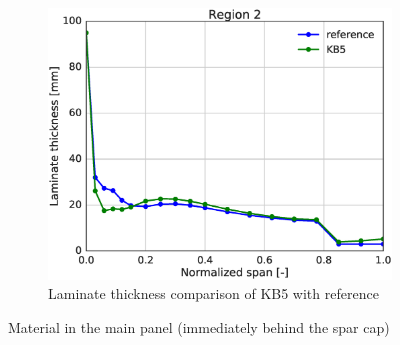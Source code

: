 \begin{figure}[tph]
\begin{subfigure}{\textwidth}
\centering
\includegraphics[width=0.50\linewidth]{figures/KB6_final/KB5_r02_thickness.eps}
\caption{Laminate thickness comparison of KB5 with reference}
\label{subfig:KB5_thick_r02}
\end{subfigure}
\caption{ Material in the main panel (immediately behind the spar cap)}
\label{fig:KB5_mat_r02}
\end{figure}

